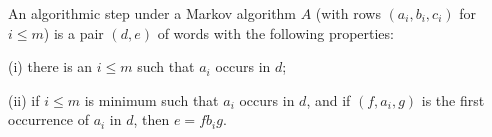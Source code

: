 An algorithmic step under a Markov algorithm $A$ (with rows $(a_i, b_i, c_i)$ for $i \leq m$) is a pair $(d, e)$ of words with the following properties:

(i) there is an $i \leq m$ such that $a_i$ occurs in $d$;

(ii) if $i \leq m$ is minimum such that $a_i$ occurs in $d$, and if $(f, a_i, g)$ is the first occurrence of $a_i$ in $d$, then $e = f b_i g$.
